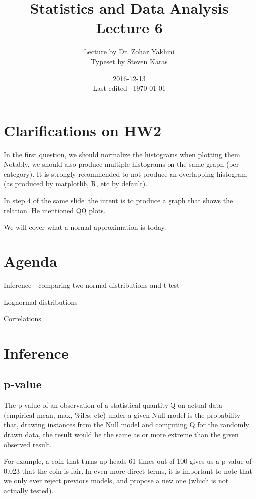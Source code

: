 \documentclass[a4paper]{article}
\title{Statistics and Data Analysis\\\large Lecture 6}
\date{2016-12-13 \\ Last edited \currenttime\ \today}
\author{Lecture by Dr. Zohar Yakhini\\Typeset by Steven Karas}
\newenvironment{enumerate*}%
  {\begin{enumerate}%
    \setlength{\itemsep}{0.5pt}%
    \setlength{\parsep}{0pt}%
    \setlength{\parskip}{0pt}}%
  {\end{enumerate}}
\begin{document}
\maketitle

\section{Clarifications on HW2}

In the first question, we should normalize the histograms when plotting them. Notably, we should also produce multiple histograms on the same graph (per category). It is strongly recommended to not produce an overlapping histogram (as produced by matplotlib, R, etc by default).

In step 4 of the same slide, the intent is to produce a graph that shows the relation. He mentioned QQ plots.

We will cover what a normal approximation is today.

\section{Agenda}

\begin{enumerate*}
  \item Inference - comparing two normal distributions and t-test
  \item Lognormal distributions
  \item Correlations
\end{enumerate*}

\section{Inference}

\subsection{p-value}
The p-value of an observation of a statistical quantity Q on actual data (empirical mean, max, \%iles, etc) under a given Null model is the probability that, drawing instances from the Null model and computing Q for the randomly drawn data, the result would be the same as or more extreme than the given observed result.

For example, a coin that turns up heads 61 times out of 100 gives us a p-value of 0.023 that the coin is fair.
In even more direct terms, it is important to note that we only ever reject previous models, and propose a new one (which is not actually tested).
\end{document}
